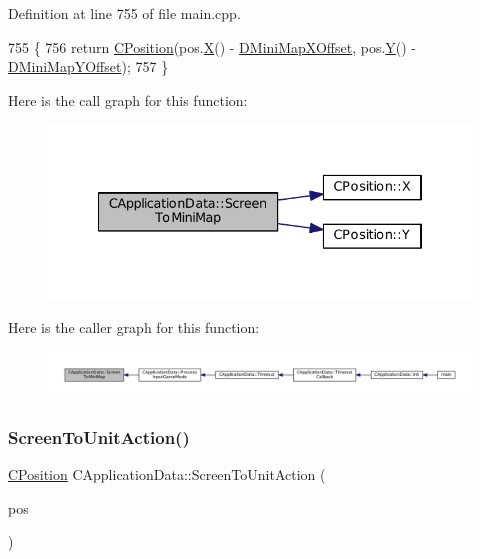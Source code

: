 Definition at line 755 of file main.\+cpp.


\begin{DoxyCode}
755                                                                \{
756     \textcolor{keywordflow}{return} \hyperlink{classCPosition}{CPosition}(pos.\hyperlink{classCPosition_a9a6b94d3b91df1492d166d9964c865fc}{X}() - \hyperlink{classCApplicationData_ae651b9d3963288c5c1f5aaf53bf9401d}{DMiniMapXOffset}, pos.\hyperlink{classCPosition_a1aa8a30e2f08dda1f797736ba8c13a87}{Y}() - 
      \hyperlink{classCApplicationData_ad33fc850bd8262a4bdf1f23e9477d5ad}{DMiniMapYOffset});
757 \}
\end{DoxyCode}
Here is the call graph for this function\+:\nopagebreak
\begin{figure}[H]
\begin{center}
\leavevmode
\includegraphics[width=334pt]{classCApplicationData_a61dfd0d1f56382b3a8f21add40e1f74a_cgraph}
\end{center}
\end{figure}
Here is the caller graph for this function\+:\nopagebreak
\begin{figure}[H]
\begin{center}
\leavevmode
\includegraphics[width=350pt]{classCApplicationData_a61dfd0d1f56382b3a8f21add40e1f74a_icgraph}
\end{center}
\end{figure}
\hypertarget{classCApplicationData_a2d956280cfd6074f56db3753c7467248}{}\label{classCApplicationData_a2d956280cfd6074f56db3753c7467248} 
\subsubsection{\texorpdfstring{Screen\+To\+Unit\+Action()}{ScreenToUnitAction()}}
{\footnotesize\ttfamily \hyperlink{classCPosition}{C\+Position} C\+Application\+Data\+::\+Screen\+To\+Unit\+Action (\begin{DoxyParamCaption}\item[{const \hyperlink{classCPosition}{C\+Position} \&}]{pos }\end{DoxyParamCaption})\hspace{0.3cm}{\ttfamily [protected]}}



